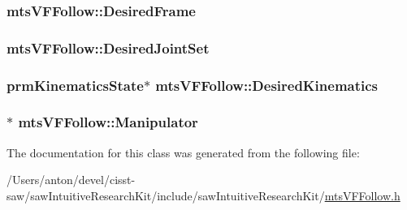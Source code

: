\subsubsection[{Desired\+Frame}]{ mts\+V\+F\+Follow\+::\+Desired\+Frame}\label{classmts_v_f_follow_a3561088c012af44b6dcd0a54f6fce5ae}
\hypertarget{classmts_v_f_follow_ae4c68fd6c7d03a6bcdb86d1e2e5dae60}{}
\subsubsection[{Desired\+Joint\+Set}]{ mts\+V\+F\+Follow\+::\+Desired\+Joint\+Set}\label{classmts_v_f_follow_ae4c68fd6c7d03a6bcdb86d1e2e5dae60}
\hypertarget{classmts_v_f_follow_a02185f7d37d06a02cd2a92e6226b5867}{}
\subsubsection[{Desired\+Kinematics}]{\setlength{\rightskip}{0pt plus 5cm}prm\+Kinematics\+State$\ast$ mts\+V\+F\+Follow\+::\+Desired\+Kinematics}\label{classmts_v_f_follow_a02185f7d37d06a02cd2a92e6226b5867}
\hypertarget{classmts_v_f_follow_ad30c27f37797a47a2461551aab20103a}{}
\subsubsection[{Manipulator}]{$\ast$ mts\+V\+F\+Follow\+::\+Manipulator}\label{classmts_v_f_follow_ad30c27f37797a47a2461551aab20103a}


The documentation for this class was generated from the following file\+:\begin{DoxyCompactItemize}
\item 
/\+Users/anton/devel/cisst-\/saw/saw\+Intuitive\+Research\+Kit/include/saw\+Intuitive\+Research\+Kit/\hyperlink{mts_v_f_follow_8h}{mts\+V\+F\+Follow.\+h}\end{DoxyCompactItemize}
